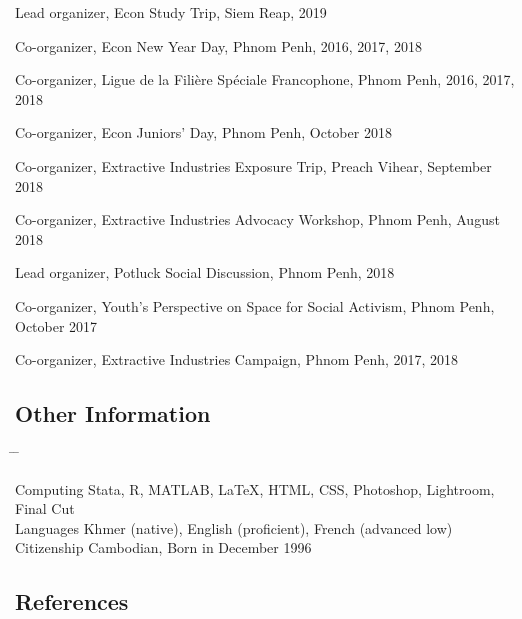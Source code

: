 \documentclass[10pt,a4paper]{article}
\newcommand{\tabbedblock}[1]{

	\begin{tabbing}
		\hspace{2cm} \= \hspace{4cm} \= \kill
		#1
	\end{tabbing}
}
\begin{document}
Lead organizer, Econ Study Trip, Siem Reap, 2019

Co-organizer, Econ New Year Day, Phnom Penh, 2016, 2017, 2018

Co-organizer, Ligue de la Filière Spéciale Francophone, Phnom Penh, 2016, 2017, 2018

Co-organizer, Econ Juniors' Day, Phnom Penh, October 2018

Co-organizer, Extractive Industries Exposure Trip, Preach Vihear, September 2018

Co-organizer, Extractive Industries Advocacy Workshop, Phnom Penh, August 2018

Lead organizer, Potluck Social Discussion, Phnom Penh, 2018

Co-organizer, Youth's Perspective on Space for Social Activism, Phnom Penh, October 2017

Co-organizer, Extractive Industries Campaign, Phnom Penh, 2017, 2018



\subsection*{Other Information}

\tabbedblock{
	Computing \> Stata, R, MATLAB, \LaTeX, HTML, CSS, Photoshop, Lightroom, Final Cut\\
	
	Languages \> Khmer (native), English (proficient), French (advanced low)\\
	
	Citizenship \> Cambodian, Born in December 1996
}


\subsection*{References}		
\end{document}
